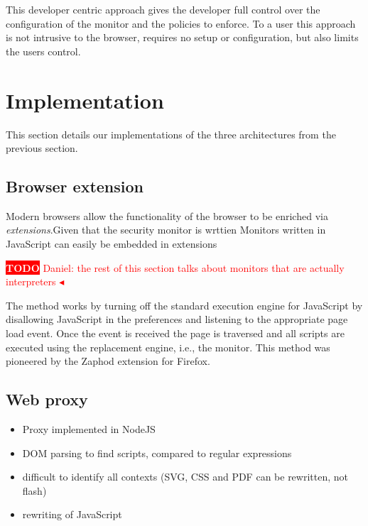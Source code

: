 \documentclass{llncs}
\newcommand{\todo}[1]{\colorbox{red}{\textcolor{white}{\sffamily\bfseries\scriptsize TODO}} \textcolor{red}{#1} \textcolor{red}{$\blacktriangleleft$}}
\begin{document}
This developer centric approach gives the developer full control over the 
configuration of the monitor and the policies to enforce. To a user this 
approach is not intrusive to the browser, requires no setup or configuration, 
but also limits the users control. 


\section{Implementation}
\label{sec:impl}

This section details our implementations of the three architectures
from the previous section. 


\subsection{Browser extension}

Modern browsers allow the functionality of the browser to be enriched via
\emph{extensions}.Given that
the security monitor is wrttien
Monitors written in JavaScript can easily be embedded in extensions

\todo{Daniel: the rest of this section talks about monitors that are actually interpreters}

The method works by turning off the standard execution engine for JavaScript
by disallowing JavaScript in the preferences and listening to the appropriate
page load event. Once the event is received the page is traversed and all
scripts are executed using the replacement engine, i.e., the monitor. This
method was pioneered by the Zaphod \cite{Zaphod} extension for Firefox.



\subsection{Web proxy}

\begin{itemize}
\item Proxy implemented in NodeJS
\item DOM parsing to find scripts, compared to regular expressions
\item difficult to identify all contexts (SVG, CSS and PDF can be rewritten, not flash)
\item rewriting of JavaScript
\end{itemize}
\end{document}
